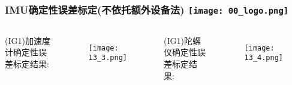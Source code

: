 
\begin{comment}
\end{comment}
\begin{frame}
\frametitle{IMU确定性误差标定(不依托额外设备法) \hfill \texttt{[image: 00\_logo.png]}}
\begin{columns}
  

  (IG1)加速度计确定性误差标定结果:
  \begin{figure}[h]
		\texttt{[image: 13\_3.png]}
  \end{figure}
  
  
  (IG1)陀螺仪确定性误差标定结果:
	\begin{figure}[h]
		\texttt{[image: 13\_4.png]}
  \end{figure}
  

\end{columns}
\end{frame} 


